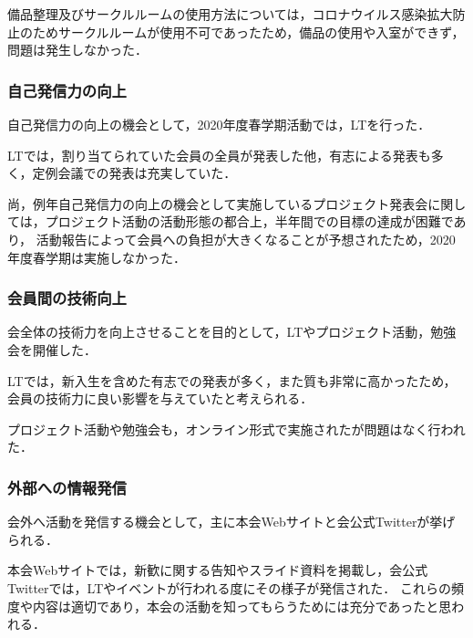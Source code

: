     備品整理及びサークルルームの使用方法については，コロナウイルス感染拡大防止のためサークルルームが使用不可であったため，備品の使用や入室ができず，問題は発生しなかった．

\subsubsection*{自己発信力の向上}
    自己発信力の向上の機会として，2020年度春学期活動では，LTを行った．

    LTでは，割り当てられていた会員の全員が発表した他，有志による発表も多く，定例会議での発表は充実していた．

    尚，例年自己発信力の向上の機会として実施しているプロジェクト発表会に関しては，プロジェクト活動の活動形態の都合上，半年間での目標の達成が困難であり，
    活動報告によって会員への負担が大きくなることが予想されたため，2020年度春学期は実施しなかった．

\subsubsection*{会員間の技術向上}
    会全体の技術力を向上させることを目的として，LTやプロジェクト活動，勉強会を開催した．

    LTでは，新入生を含めた有志での発表が多く，また質も非常に高かったため，会員の技術力に良い影響を与えていたと考えられる．

    プロジェクト活動や勉強会も，オンライン形式で実施されたが問題はなく行われた．

\subsubsection*{外部への情報発信}
    会外へ活動を発信する機会として，主に本会Webサイトと会公式Twitterが挙げられる．

    本会Webサイトでは，新歓に関する告知やスライド資料を掲載し，会公式Twitterでは，LTやイベントが行われる度にその様子が発信された．
    これらの頻度や内容は適切であり，本会の活動を知ってもらうためには充分であったと思われる．
